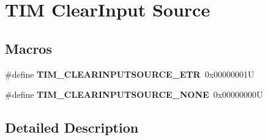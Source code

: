 \hypertarget{group___t_i_m___clear_input___source}{}\section{T\+IM Clear\+Input Source}
\label{group___t_i_m___clear_input___source}
\subsection*{Macros}
\begin{DoxyCompactItemize}
\item 
\mbox{\label{group___t_i_m___clear_input___source_gaa28a8cf1db85cf6c845c6c1f02ba5c8e}} 
\#define {\bfseries T\+I\+M\+\_\+\+C\+L\+E\+A\+R\+I\+N\+P\+U\+T\+S\+O\+U\+R\+C\+E\+\_\+\+E\+TR}~0x00000001U
\item 
\mbox{\label{group___t_i_m___clear_input___source_ga48c5312aecd377fab00d62e9b4169e9e}} 
\#define {\bfseries T\+I\+M\+\_\+\+C\+L\+E\+A\+R\+I\+N\+P\+U\+T\+S\+O\+U\+R\+C\+E\+\_\+\+N\+O\+NE}~0x00000000U
\end{DoxyCompactItemize}


\subsection{Detailed Description}
